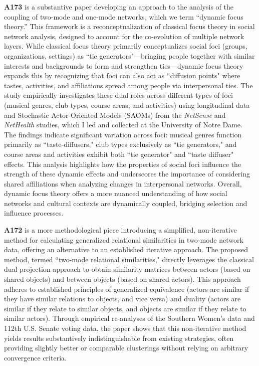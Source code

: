 \documentclass[a4paper,11pt]{extarticle}
\begin{document}
\textbf{A173} is a substantive paper developing an approach to the analysis of the coupling of two-mode and one-mode networks, which we term ``dynamic focus theory.'' This framework is a reconceptualization of classical focus theory in social network analysis, designed to account for the co-evolution of multiple network layers. While classical focus theory primarily conceptualizes social foci (groups, organizations, settings) as ``tie generators"---bringing people together with similar interests and backgrounds to form and strengthen ties---dynamic focus theory expands this by recognizing that foci can also act as ``diffusion points" where tastes, activities, and affiliations spread among people via interpersonal ties. The study empirically investigates these dual roles across different types of foci (musical genres, club types, course areas, and activities) using longitudinal data and Stochastic Actor-Oriented Models (SAOMs) from the \textit{NetSense} and \textit{NetHealth} studies, which I led and collected at the University of Notre Dame. The findings indicate significant variation across foci: musical genres function primarily as ``taste-diffusers," club types exclusively as ``tie generators," and course areas and activities exhibit both ``tie generator" and ``taste diffuser" effects. This analysis highlights how the properties of social foci influence the strength of these dynamic effects and underscores the importance of considering shared affiliations when analyzing changes in interpersonal networks. Overall, dynamic focus theory offers a more nuanced understanding of how social networks and cultural contexts are dynamically coupled, bridging selection and influence processes.

\textbf{A172} is a more methodological piece introducing a simplified, non-iterative method for calculating generalized relational similarities in two-mode network data, offering an alternative to an established iterative approach. The proposed method, termed ``two-mode relational similarities," directly leverages the classical dual projection approach to obtain similarity matrices between actors (based on shared objects) and between objects (based on shared actors). This approach adheres to established principles of generalized equivalence (actors are similar if they have similar relations to objects, and vice versa) and duality (actors are similar if they relate to similar objects, and objects are similar if they relate to similar actors). Through empirical re-analyses of the Southern Women's data and 112th U.S. Senate voting data, the paper shows that this non-iterative method yields results substantively indistinguishable from existing strategies, often providing slightly better or comparable clusterings without relying on arbitrary convergence criteria. 
\end{document}
